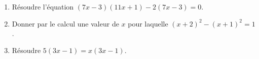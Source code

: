 
\begin{exercice}\label{exosmath-0371}

    \begin{enumerate}
        \item
            Résoudre l'équation $(7x-3)(11x+1)-2(7x-3)=0$.
        \item
            Donner par le calcul une valeur de \( x\) pour laquelle $(x+2)^2-(x+1)^2=1$.
        \item
            Résoudre \( 5(3x-1)=x(3x-1)\).
    \end{enumerate}

\end{exercice}
